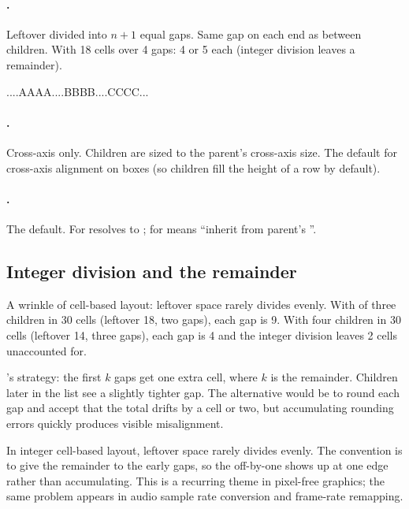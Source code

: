 \paragraph{.} Leftover divided into $n + 1$
equal gaps. Same gap on each end as between children. With 18
cells over 4 gaps: 4 or 5 each (integer division leaves a remainder).

\begin{terminalbox}
....AAAA....BBBB....CCCC...
\end{terminalbox}

\paragraph{.} Cross-axis only. Children are sized to
the parent's cross-axis size. The default for cross-axis alignment
on boxes (so children fill the height of a row by default).

\paragraph{.} The default. For 
resolves to ; for  means ``inherit
from parent's ''.

\subsection{Integer division and the remainder}

A wrinkle of cell-based layout: leftover space rarely divides
evenly. With  of three children in 30 cells
(leftover 18, two gaps), each gap is 9. With four children in 30
cells (leftover 14, three gaps), each gap is 4 and the integer
division leaves 2 cells unaccounted for.

\maya{}'s strategy: the first $k$ gaps get one extra cell, where
$k$ is the remainder. Children later in the list see a slightly
tighter gap. The alternative would be to round each gap and
accept that the total drifts by a cell or two, but accumulating
rounding errors quickly produces visible misalignment.

\begin{idea}
In integer cell-based layout, leftover space rarely divides
evenly. The convention is to give the remainder to the early gaps,
so the off-by-one shows up at one edge rather than accumulating.
This is a recurring theme in pixel-free graphics; the same
problem appears in audio sample rate conversion and frame-rate
remapping.
\end{idea}


